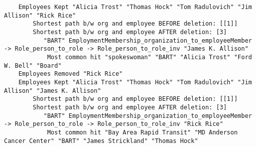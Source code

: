 \documentclass{tufte-handout}
\begin{document}
\begin{enumerate}
\begin{lstlisting}
    Employees Kept "Alicia Trost" "Thomas Hock" "Tom Radulovich" "Jim Allison" "Rick Rice"
        Shortest path b/w org and employee BEFORE deletion: [[1]]
        Shortest path b/w org and employee AFTER deletion: [3]
           "BART" EmploymentMembership_organization_to_employeeMember -> Role_person_to_role -> Role_person_to_role_inv "James K. Allison"
            Most common hit "spokeswoman" "BART" "Alicia Trost" "Ford W. Bell" "Board"
    Employees Removed "Rick Rice"
    Employees Kept "Alicia Trost" "Thomas Hock" "Tom Radulovich" "Jim Allison" "James K. Allison"
        Shortest path b/w org and employee BEFORE deletion: [[1]]
        Shortest path b/w org and employee AFTER deletion: [3]
           "BART" EmploymentMembership_organization_to_employeeMember -> Role_person_to_role -> Role_person_to_role_inv "Rick Rice"
            Most common hit "Bay Area Rapid Transit" "MD Anderson Cancer Center" "BART" "James Strickland" "Thomas Hock"



\end{lstlisting}
\end{enumerate}
\end{document}
